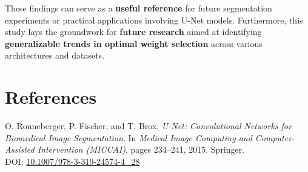 \documentclass{article}
\begin{document}
These findings can serve as a \textbf{useful reference} for future segmentation experiments or practical applications involving U-Net models. Furthermore, this study lays the groundwork for \textbf{future research} aimed at identifying \textbf{generalizable trends in optimal weight selection} across various architectures and datasets.


\section{References}

\begin{thebibliography}{9}

O. Ronneberger, P. Fischer, and T. Brox, 
\textit{U-Net: Convolutional Networks for Biomedical Image Segmentation}. 
In \textit{Medical Image Computing and Computer-Assisted Intervention (MICCAI)}, 
pages 234--241, 2015. Springer. \\
DOI: \href{https://doi.org/10.1007/978-3-319-24574-4_28}{10.1007/978-3-319-24574-4\_28}

\end{thebibliography}
\end{document}
